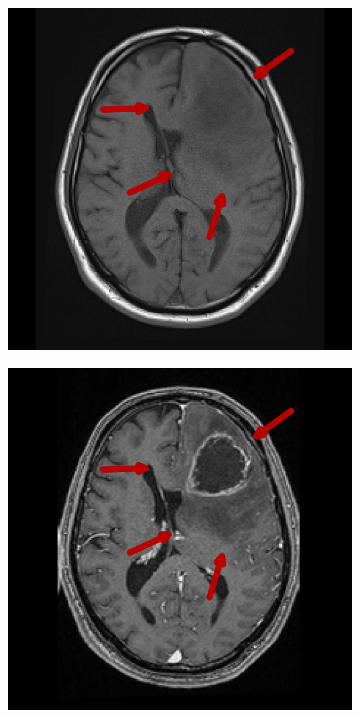 \begin{figure}[hbt]
    \centering
    \begin{subfigure}[b]{0.45\textwidth}
        \centering
        \includegraphics[width=\textwidth]{Figures/T1_arrows.png}
        \caption{}\label{fig:intro_T1}
    \end{subfigure}
    \begin{subfigure}[b]{0.45\textwidth}
        \centering
        \includegraphics[width=\textwidth]{Figures/T1GD_arrows.png}
        \caption{}\label{fig:intro_T1GD}
    \end{subfigure}


\end{figure}
